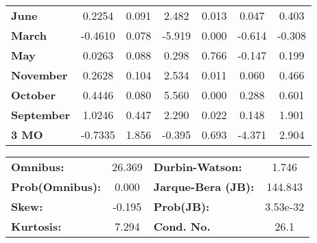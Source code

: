 \begin{center}
\begin{tabular}{lcccccc}
\textbf{June}      &       0.2254  &        0.091     &     2.482  &         0.013        &        0.047    &        0.403     \\
\textbf{March}     &      -0.4610  &        0.078     &    -5.919  &         0.000        &       -0.614    &       -0.308     \\
\textbf{May}       &       0.0263  &        0.088     &     0.298  &         0.766        &       -0.147    &        0.199     \\
\textbf{November}  &       0.2628  &        0.104     &     2.534  &         0.011        &        0.060    &        0.466     \\
\textbf{October}   &       0.4446  &        0.080     &     5.560  &         0.000        &        0.288    &        0.601     \\
\textbf{September} &       1.0246  &        0.447     &     2.290  &         0.022        &        0.148    &        1.901     \\
\textbf{3 MO}      &      -0.7335  &        1.856     &    -0.395  &         0.693        &       -4.371    &        2.904     \\
\bottomrule
\end{tabular}
\begin{tabular}{lclc}
\textbf{Omnibus:}       & 26.369 & \textbf{  Durbin-Watson:     } &    1.746  \\
\textbf{Prob(Omnibus):} &  0.000 & \textbf{  Jarque-Bera (JB):  } &  144.843  \\
\textbf{Skew:}          & -0.195 & \textbf{  Prob(JB):          } & 3.53e-32  \\
\textbf{Kurtosis:}      &  7.294 & \textbf{  Cond. No.          } &     26.1  \\
\bottomrule
\end{tabular}
\end{center}

